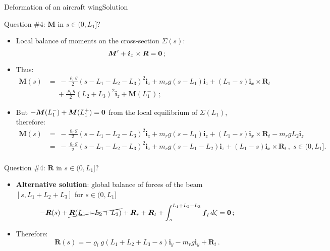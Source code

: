 \documentclass{beamer}
\newcommand{\id}{d}
\newcommand{\xj}{x}
\newcommand{\yj}{y}
\newcommand{\zj}{z}
\renewcommand{\ij}{i}
\newcommand{\iv}{{\boldsymbol\ij}}
\newcommand{\fj}{f}
\newcommand{\fv}{{\boldsymbol\fj}}
\newcommand{\roi}{\varrho}
\newcommand{\Fresj}{R}
\newcommand{\Mresj}{M}
\newcommand{\Fres}{{\boldsymbol\Fresj}}
\newcommand{\Mres}{{\boldsymbol\Mresj}}
\newcommand{\bzero}{{\bf 0}}
\begin{document}
\begin{frame}{Deformation of an aircraft wing}{Solution}
\begin{overprint}
\vskip-20pt
\begin{exampleblock}{Question \#4: $\Mres$ in $s\in(0,L_1]$?}
\begin{itemize}
\item Local balance of moments on the cross-section $\Sigma(s)$:
\begin{displaymath}
\Mres'+\iv_\xj\times\Fres=\bzero\,;
\end{displaymath}
\item Thus:
\begin{displaymath}
\begin{split}
\!\!\!\!\Mres(s) &= \scriptstyle\; -\frac{\roi_l g}{2}(s-L_1-L_2-L_3)^2\iv_\zj + m_r g(s-L_1)\iv_\zj +(L_1-s)\iv_\xj\times\Fres_t \\
& \scriptstyle\;\quad+\frac{\roi_l g}{2}(L_2+L_3)^2\iv_\zj +\Mres(L_1^-)\,;
\end{split}
\end{displaymath}
\item But $-\Mres(L_1^-)+\Mres(L_1^+)=\bzero$ from the local equilibrium of $\Sigma(L_1)$, therefore:
\begin{displaymath}
\begin{split}
\!\!\!\!\!\!\!\!\!\!\!\!\!\!\!\!\Mres(s)  &= \scriptstyle\; -\frac{\roi_l g}{2}(s-L_1-L_2-L_3)^2\iv_\zj + m_r g(s-L_1)\iv_\zj +(L_1-s)\iv_\xj\times\Fres_t -m_r g L_2\iv_\zj \\
&= \scriptstyle\; -\frac{\roi_l g}{2}(s-L_1-L_2-L_3)^2\iv_\zj + m_r g(s-L_1-L_2)\iv_\zj +(L_1-s)\iv_\xj\times\Fres_t \,,\; s\in(0,L_1]. \\
\end{split}
\end{displaymath}
\end{itemize}
\end{exampleblock}

\vskip-20pt
\begin{exampleblock}{Question \#4: $\Fres$ in $s\in(0,L_1]$?}
\begin{itemize}
\item {\bf Alternative solution}: global balance of forces of the beam $[s,L_1+L_2+L_3]$ for $s\in(0,L_1]$
\begin{displaymath}
-\Fres(s)+\cancel{\Fres(L_1+L_2+L_3)}+\Fres_r+\Fres_t+\int_s^{L_1+L_2+L_3}\fv_l\,\id\zeta=\bzero\,;
\end{displaymath}
\item Therefore:
\begin{displaymath}
\Fres(s)=-\roi_l g(L_1+L_2+L_3-s)\iv_\yj-m_r g\iv_\yj+\Fres_t\,.
\end{displaymath}
\end{itemize}
\end{exampleblock}


\end{overprint}
\end{frame}
\end{document}
